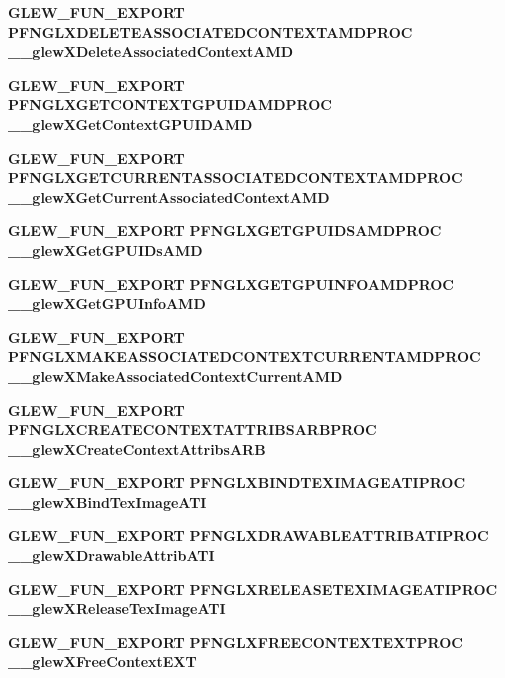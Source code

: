 \begin{DoxyCompactItemize}
\item 
{\bf G\+L\+E\+W\+\_\+\+F\+U\+N\+\_\+\+E\+X\+P\+O\+RT} {\bf P\+F\+N\+G\+L\+X\+D\+E\+L\+E\+T\+E\+A\+S\+S\+O\+C\+I\+A\+T\+E\+D\+C\+O\+N\+T\+E\+X\+T\+A\+M\+D\+P\+R\+OC} {\bf \+\_\+\+\_\+glew\+X\+Delete\+Associated\+Context\+A\+MD}
\item 
{\bf G\+L\+E\+W\+\_\+\+F\+U\+N\+\_\+\+E\+X\+P\+O\+RT} {\bf P\+F\+N\+G\+L\+X\+G\+E\+T\+C\+O\+N\+T\+E\+X\+T\+G\+P\+U\+I\+D\+A\+M\+D\+P\+R\+OC} {\bf \+\_\+\+\_\+glew\+X\+Get\+Context\+G\+P\+U\+I\+D\+A\+MD}
\item 
{\bf G\+L\+E\+W\+\_\+\+F\+U\+N\+\_\+\+E\+X\+P\+O\+RT} {\bf P\+F\+N\+G\+L\+X\+G\+E\+T\+C\+U\+R\+R\+E\+N\+T\+A\+S\+S\+O\+C\+I\+A\+T\+E\+D\+C\+O\+N\+T\+E\+X\+T\+A\+M\+D\+P\+R\+OC} {\bf \+\_\+\+\_\+glew\+X\+Get\+Current\+Associated\+Context\+A\+MD}
\item 
{\bf G\+L\+E\+W\+\_\+\+F\+U\+N\+\_\+\+E\+X\+P\+O\+RT} {\bf P\+F\+N\+G\+L\+X\+G\+E\+T\+G\+P\+U\+I\+D\+S\+A\+M\+D\+P\+R\+OC} {\bf \+\_\+\+\_\+glew\+X\+Get\+G\+P\+U\+I\+Ds\+A\+MD}
\item 
{\bf G\+L\+E\+W\+\_\+\+F\+U\+N\+\_\+\+E\+X\+P\+O\+RT} {\bf P\+F\+N\+G\+L\+X\+G\+E\+T\+G\+P\+U\+I\+N\+F\+O\+A\+M\+D\+P\+R\+OC} {\bf \+\_\+\+\_\+glew\+X\+Get\+G\+P\+U\+Info\+A\+MD}
\item 
{\bf G\+L\+E\+W\+\_\+\+F\+U\+N\+\_\+\+E\+X\+P\+O\+RT} {\bf P\+F\+N\+G\+L\+X\+M\+A\+K\+E\+A\+S\+S\+O\+C\+I\+A\+T\+E\+D\+C\+O\+N\+T\+E\+X\+T\+C\+U\+R\+R\+E\+N\+T\+A\+M\+D\+P\+R\+OC} {\bf \+\_\+\+\_\+glew\+X\+Make\+Associated\+Context\+Current\+A\+MD}
\item 
{\bf G\+L\+E\+W\+\_\+\+F\+U\+N\+\_\+\+E\+X\+P\+O\+RT} {\bf P\+F\+N\+G\+L\+X\+C\+R\+E\+A\+T\+E\+C\+O\+N\+T\+E\+X\+T\+A\+T\+T\+R\+I\+B\+S\+A\+R\+B\+P\+R\+OC} {\bf \+\_\+\+\_\+glew\+X\+Create\+Context\+Attribs\+A\+RB}
\item 
{\bf G\+L\+E\+W\+\_\+\+F\+U\+N\+\_\+\+E\+X\+P\+O\+RT} {\bf P\+F\+N\+G\+L\+X\+B\+I\+N\+D\+T\+E\+X\+I\+M\+A\+G\+E\+A\+T\+I\+P\+R\+OC} {\bf \+\_\+\+\_\+glew\+X\+Bind\+Tex\+Image\+A\+TI}
\item 
{\bf G\+L\+E\+W\+\_\+\+F\+U\+N\+\_\+\+E\+X\+P\+O\+RT} {\bf P\+F\+N\+G\+L\+X\+D\+R\+A\+W\+A\+B\+L\+E\+A\+T\+T\+R\+I\+B\+A\+T\+I\+P\+R\+OC} {\bf \+\_\+\+\_\+glew\+X\+Drawable\+Attrib\+A\+TI}
\item 
{\bf G\+L\+E\+W\+\_\+\+F\+U\+N\+\_\+\+E\+X\+P\+O\+RT} {\bf P\+F\+N\+G\+L\+X\+R\+E\+L\+E\+A\+S\+E\+T\+E\+X\+I\+M\+A\+G\+E\+A\+T\+I\+P\+R\+OC} {\bf \+\_\+\+\_\+glew\+X\+Release\+Tex\+Image\+A\+TI}
\item 
{\bf G\+L\+E\+W\+\_\+\+F\+U\+N\+\_\+\+E\+X\+P\+O\+RT} {\bf P\+F\+N\+G\+L\+X\+F\+R\+E\+E\+C\+O\+N\+T\+E\+X\+T\+E\+X\+T\+P\+R\+OC} {\bf \+\_\+\+\_\+glew\+X\+Free\+Context\+E\+XT}

\end{DoxyCompactItemize}

